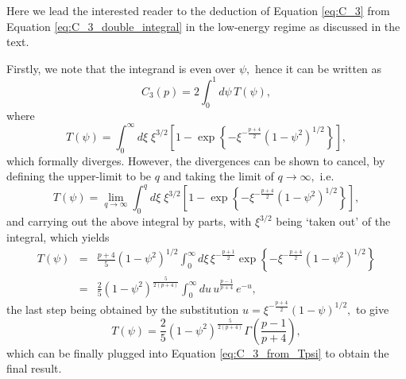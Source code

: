 Here we lead the interested reader to the deduction of Equation \ref{eq:C_3} from Equation \ref{eq:C_3_double_integral} in the low-energy regime as discussed in the text.

Firstly, we note that the integrand is even over $ \psi, $ hence it can be written as
\begin{equation}
C_3(p) = 2 \int_{0}^{1}d\psi\, T(\psi),
\label{eq:C_3_from_Tpsi}
\end{equation}
where
\begin{equation}
T(\psi) = \int_{0}^{\infty} d\xi \; \xi^{3/2} \left[ 1 - \exp \left\{ -\xi^{-\frac{p+4}{2}}\left(1-\psi^{2}\right)^{1/2} \right\} \right],
\end{equation}
which formally diverges. However, the divergences can be shown to cancel, by defining the upper-limit to be $q$ and taking the limit of $ q \rightarrow \infty , $ i.e.
\begin{equation}
T(\psi) = \lim_{q \to \infty} \int_{0}^{q }d\xi \; \xi^{3/2} \left[ 1 - \exp \left\{ -\xi^{-\frac{p+4}{2}}\left(1-\psi^{2}\right)^{1/2} \right\} \right],
\end{equation}
and carrying out the above integral by parts, with $ \xi^{3/2} $ being `taken out' of the integral, which yields
\begin{eqnarray}
T(\psi) & = & \frac{p+4}{5} (1-\psi^2)^{1/2} \int_{0}^{\infty}d\xi\,\xi^{-\frac{p+1}{2}} \exp \left\{ -\xi^{-\frac{p+4}{2}}\left(1-\psi^{2}\right)^{1/2} \right\} \\
 & = & \frac{2}{5} (1-\psi^2)^{ \frac{5}{2(p+4)} } \int_{0}^{\infty}du \, u^{ \frac{p-1}{p+4} } \, e^{-u},
\end{eqnarray}
the last step being obtained by the substitution $ u = \xi^{ - \frac{p+4}{2} } (1-\psi)^{1/2} , $ to give
\begin{equation}
T(\psi) = \frac{2}{5} (1-\psi^2)^{ \frac{5}{2(p+4)} } \Gamma\left( \frac{p-1}{p+4} \right),
\end{equation}
which can be finally plugged into Equation \ref{eq:C_3_from_Tpsi} to obtain the final result.